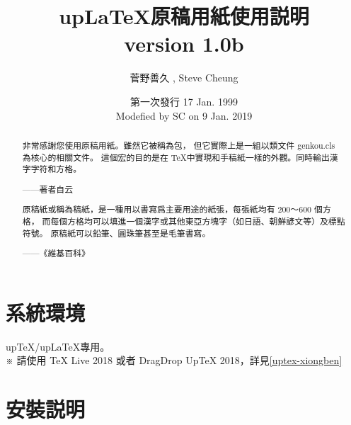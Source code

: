 \documentclass[a4,11pt,uplatex,openleft]{jsarticle}
\title{\Large \gtfamily up\LaTeX 原稿用紙使用説明\\ version 1.0b }
\author{\CID{8015}菅野善久  \footnotemark[1]   , \CID{8015}Steve Cheung \footnotemark[2]   }
\date{ \normalsize 第一次發行 17 Jan. 1999 \\ Modefied by SC on 9 Jan. 2019  }
\begin{document}
\mcfamily

\maketitle

\begin{abstract}
\doublespacing    \large
\par  非常感謝您使用原稿用紙。雖然它被稱為包，
但它實際上是一組以類文件 genkou.cls 為核心的相關文件。
這個宏的目的是在 \TeX 中實現和手稿紙一樣的外觀。同時輸出漢字字符和方格。
\par \hfill ——著者自云
\vspace{2 zw}
\par  原稿紙或稱為稿紙，是一種用以書寫爲主要用途的紙張，每張紙均有 200～600 個方格，
而每個方格均可以填進一個漢字或其他東亞方塊字（如日語、朝鮮諺文等）及標點符號。
原稿紙可以鉛筆、圓珠筆甚至是毛筆書寫。
\par \hfill ——《維基百科》
\end{abstract}
\clearpage
{  \singlespacing    \fontsize{12pt}{17pt}\selectfont
\tableofcontents }
\clearpage
\section{系統環境}
\par up\TeX/up\LaTeX 專用。\\
※ 請\hspace{3pt}使用 \TeX \hspace{3pt} Live 2018 或者 DragDrop Up\TeX
\hspace{3pt}  2018，詳見\ref{uptex-xiongben}

\section{安裝説明}
\end{document}
